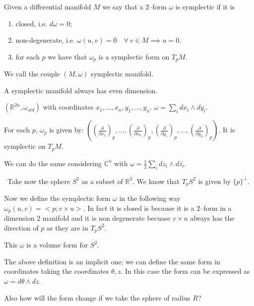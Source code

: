 \documentclass[misc]{subfiles}
\begin{document}
 

\begin{Dfn}
    Given a differential manifold $M$ we say that a $2$--form $\omega$ is symplectic if it is
    \begin{enumerate}[label=\DfnLbl]

        \item closed, i.e. $d\omega=0$;

        \item non-degenerate, i.e. $\omega(u,v)=0 \quad \forall \ v\in M \implies u=0$.

        \item for each $p$ we have that $\omega_p$ is a symplectic form on $T_pM$.
    \end{enumerate}

    We call the couple $(M,\omega)$ symplectic manifold.
\end{Dfn}

\begin{Prp}
    A symplectic manifold always has even dimension.
\end{Prp}

\begin{Exp}
    $(\mathbb{R}^{2n},\omega_{std})$ with coordinates $x_1,\dots,x_n,y_1,\dots,y_n$. $\omega=\sum_i dx_i \wedge dy_i$.

    For each $p$, $\omega_p$ is given by: $\left( (\frac{\partial}{\partial x_1})_p, \dots, (\frac{\partial}{\partial x_n})_p, (\frac{\partial}{\partial y_1})_p, \dots, (\frac{\partial}{\partial y_n})_p\right)$. It is symplectic on $T_pM$.

    We can do the same considering $\mathbb{C}^n$ with $\omega=\frac{1}{2} \sum_i dz_i \wedge d\bar{z_i}$.
\end{Exp}

\begin{Exp}\
    Take now the sphere $S^2$ as a subset of $\mathbb{R}^3$. We know that $T_pS^2$ is given by $\{p\}^\perp$.

    Now we define the symplectic form $\omega$ in the following way $\omega_p(u,v)=<p; v \times u>$. In fact it is closed is because it is a $2$--form in a dimension $2$ manifold and it is non degenerate becuase $v \times u$ always has the direction of $p$ as they are in $T_pS^2$.\

    This $\omega$ is a volume form for $S^2$.
\end{Exp}

\begin{Exc}
    The above definition is an implicit one; we can define the same form in coordinates taking the coordinates $\theta, z$. In this case the form can be expressed as $\omega= d\theta \wedge dz$.

    Also how will the form change if we take the sphere of radius $R$?
\end{Exc}
\end{document}
